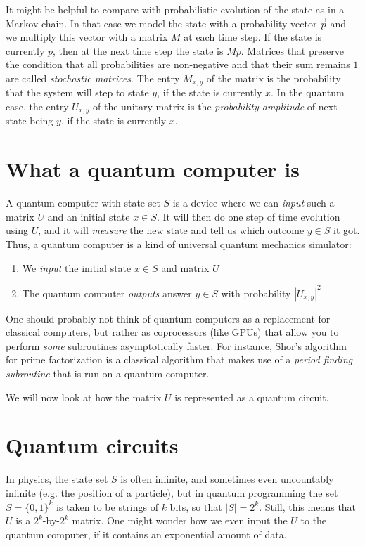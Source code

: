 It might be helpful to compare with probabilistic evolution of the state as in a Markov chain.
In that case we model the state with a probability vector $\vec{p}$ and we multiply this vector with a matrix $M$ at each time step.
If the state is currently $p$, then at the next time step the state is $Mp$.
Matrices that preserve the condition that all probabilities are non-negative and that their sum remains $1$ are called \emph{stochastic matrices}.
The entry $M_{x,y}$ of the matrix is the probability that the system will step to state $y$, if the state is currently $x$.
In the quantum case, the entry $U_{x,y}$ of the unitary matrix is the \emph{probability amplitude} of next state being $y$, if the state is currently $x$.

\section{What a quantum computer is}

A quantum computer with state set $S$ is a device where we can \emph{input} such a matrix $U$ and an initial state $x \in S$.
It will then do one step of time evolution using $U$, and it will \emph{measure} the new state and tell us which outcome $y \in S$ it got.
Thus, a quantum computer is a kind of universal quantum mechanics simulator:
\begin{enumerate}
  \item We \emph{input} the initial state $x \in S$ and matrix $U$
  \item The quantum computer \emph{outputs} answer $y \in S$ with probability $|U_{x,y}|^2$
\end{enumerate}

One should probably not think of quantum computers as a replacement for classical computers,
but rather as coprocessors (like GPUs) that allow you to perform \emph{some} subroutines asymptotically faster.
For instance, Shor's algorithm for prime factorization is a classical algorithm that makes use of a \emph{period finding subroutine} that is run on a quantum computer.

We will now look at how the matrix $U$ is represented as a quantum circuit.

\section{Quantum circuits}

In physics, the state set $S$ is often infinite, and sometimes even uncountably infinite (e.g. the position of a particle),
but in quantum programming the set $S = \{0,1\}^k$ is taken to be strings of $k$ bits, so that $|S| = 2^k$.
Still, this means that $U$ is a $2^k$-by-$2^k$ matrix. One might wonder how we even input the $U$ to the quantum computer, if it contains an exponential amount of data.

